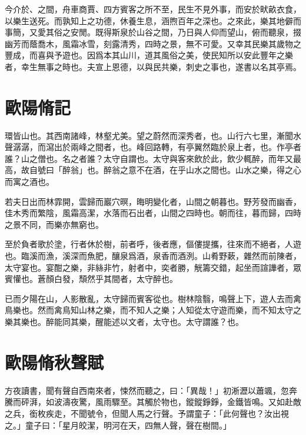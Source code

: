 今介{於}、之間，舟車商賈、四方賓客之所不至，民生不見外事，而安於畎畝衣食，以樂生送死。而孰知上之功德，休養生息，涵煦{}百年之深也。之來此，樂其地僻而事簡，又愛其俗之安閒。既得斯泉於山谷之間，乃日與人仰而望山，俯而聽泉，掇幽芳而蔭喬木，風霜冰雪，刻露清秀，四時之景，無不可愛。又幸其民樂其歲物之豐成，而喜與予遊也。因爲本其山川，道其風俗之美，使民知所以安此豐年之樂者，幸生無事之時也。夫宣上恩德，以與民共樂，刺史之事也，遂書以名其亭焉。%

\theendnotes

\section[醉翁亭記\quad{\small 歐陽脩}]{{\normalsize 歐陽脩}\quad{}記}
環皆山也。其西南諸峰，林壑尤美。望之蔚然而深秀者，也。山行六七里，漸聞水聲潺潺，而瀉出於兩峰之間者，也。峰回路轉，有亭翼然臨於泉上者，也。作亭者誰？山之僧也。名之者誰？太守自謂也。太守與客來飲於此，飲少輒醉，而年又最高，故自號曰「醉翁」也。醉翁之意不在酒，在乎山水之間也。山水之樂，得之心而寓之酒也。

若夫日出而林霏開，雲歸而巖穴暝，晦明變化者，山間之朝暮也。野芳發而幽香，佳木秀而繁陰，風霜高潔，水落而石出者，山間之四時也。朝而往，暮而歸，四時之景不同，而樂亦無窮也。

至於負者歌於塗，行者休於樹，前者呼，後者應，傴僂提攜，往來而不絕者，人遊也。臨溪而漁，溪深而魚肥，釀泉爲酒，泉香而酒洌。山肴野蔌，雜然而前陳者，太守宴也。宴酣之樂，非絲非竹，射者中，奕者勝，觥籌交錯，{起坐}而諠譁者，眾賓懽也。蒼顏白發，頹然乎其間者，太守醉也。%

已而夕陽在山，人影散亂，太守歸而賓客從也。樹林陰翳，鳴聲上下，遊人去而禽鳥樂也。然而禽鳥知山林之樂，而不知人之樂；人知從太守遊而樂，而不知太守之樂其樂也。醉能同其樂，醒能述以文者，太守也。太守謂誰？也。

\section[秋聲賦\quad{\small 歐陽脩}]{{\normalsize 歐陽脩}\quad 秋聲賦}
方夜讀書，聞有聲自西南來者，悚然而聽之，曰：「異哉！」初淅瀝以蕭颯，忽奔騰而砰湃，如波濤夜驚，風雨驟至。其觸於物也，鏦鏦錚錚，金鐵皆鳴。又如赴敵之兵，銜枚疾走，不聞號令，但聞人馬之行聲。予謂童子：「此何聲也？汝出視之。」童子曰：「星月皎潔，明河在天，四無人聲，聲在樹間。」

